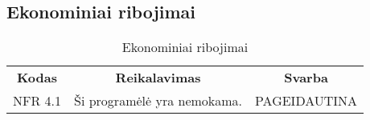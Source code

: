 \documentclass{VUMIFPSkursinis}
\begin{document}
\subsection{Ekonominiai ribojimai}
\begin{center}
	\begin{table}[H]
	\begin{tabular}{|p{2cm}|p{}|p{}|}
	\hline
	    \rowcolor{lightgray}
		\multicolumn{3}{|c|}{Ekonominiai ribojimai}\\
		
	\hline
		\multicolumn{1}{|c|}{{\bfseries Kodas}}&
		\multicolumn{1}{|c|}{{\bfseries Reikalavimas}}&
		\multicolumn{1}{|c|}{{\bfseries Svarba}}\\
	\hline 	
		\multicolumn{1}{|c|}{NFR 4.1}&
		{Ši programėlė yra nemokama.}&
		\multicolumn{1}{|p{1.5cm}|}{PAGEIDAUTINA}\\	
	
	\hline
	
	
	\end{tabular}
	\caption{Ekonominiai ribojimai}
	\label{table:Ekonominiairibojimai}
	\end{table}

\end{center}

\pagebreak
\end{document}
